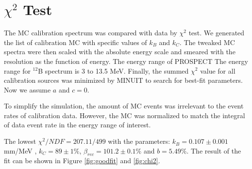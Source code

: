 \section{$\chi^2$ Test}
The MC calibration spectrum was compared with data by $\chi^2$ test. We generated the list of calibration MC with specific values of $k_B$ and $k_C$. The tweaked MC spectra were then scaled with the absolute energy scale and smeared with the resolution as the function of energy. The energy range of PROSPECT The energy range for $^{12}$B spectrum is 3 to 13.5 MeV. Finally, the summed $\chi^2$ value for all calibration sources was minimized by MINUIT to search for best-fit parameters. Now we assume $a$ and $c = 0$. 

To simplify the simulation, the amount of MC events was irrelevant to the event rates of calibration data. However, the MC was normalized to match the integral of data event rate in the energy range of interest. 

The lowest $\chi^2/NDF = 207.11/499$ with the parameters: $k_B = 0.107 \pm 0.001$ mm/MeV , $k_C = 89 \pm 1\%$, $\beta_{rec} = 101.2 \pm 0.1\%$ and $b = 5.49\%$. The result of the fit can be shown in Figure \ref{fig:goodfit} and \ref{fig:chi2}.

